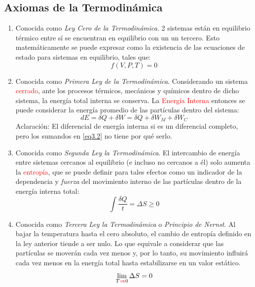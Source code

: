 \documentclass{book}
\begin{document}
\subsection{Axiomas de la Termodinámica}
\begin{enumerate}
    \item Conocida como \textit{Ley Cero de la Termodinámica}. 2 sistemas están en equilibrio térmico entre sí se encuentran en equilibrio con un un tercero. Esto matemáticamente se puede expresar como la existencia de las ecuaciones de estado para sistemas en equilibrio, tales que: 
    \begin{equation}\label{eq3.1}{f(V,P,T)=0}\end{equation}
    \item Conocida como \textit{Primera Ley de la Termodinámica}. Considerando un sistema \textcolor{red}{cerrado}, ante los procesos térmicos, mecánicos y químicos dentro de dicho sistema, la energía total interna se conserva. La \textcolor{red}{Energía Interna} entonces se puede considerar la energía promedio de las partículas dentro del sistema:
    \begin{equation}\label{eq3.2}{dE=\delta Q+\delta W= \delta Q+ \delta W_M + \delta W_C}\end{equation} Aclaración: El diferencial de energía interna si es un diferencial completo, pero los sumandos en \ref{eq3.2} no tiene por qué serlo. 
    \item Conocida como \textit{Segunda Ley la Termodinámica}. El intercambio de energía entre sistemas cercanos al equilibrio (e incluso no cercanos a él) solo aumenta la \textcolor{red}{entropía}, que se puede definir para tales efectos como un indicador de la dependencia y \textit{fuerza} del movimiento interno de las partículas dentro de la energía interna total:
    \begin{equation}\label{eq3.3}{\int\frac{\delta Q}{t}=\Delta S \geq 0  }\end{equation}
    \item Conocida como \textit{Tercera Ley la Termodinámica} o \textit{Principio de Nernst}. Al bajar la temperatura hasta el cero absoluto, el cambio de entropía definido en la ley anterior tiende a ser nulo. Lo que equivale a considerar que las partículas se moverán cada vez menos y, por lo tanto, su movimiento influirá cada vez menos en la energía total hasta estabilizarse en un valor estático.
    \begin{equation}\label{eq3.4}{\lim_{T\textcolor{red}{\Rightarrow} 0} \Delta S=0}\end{equation}

\end{enumerate}
\end{document}
